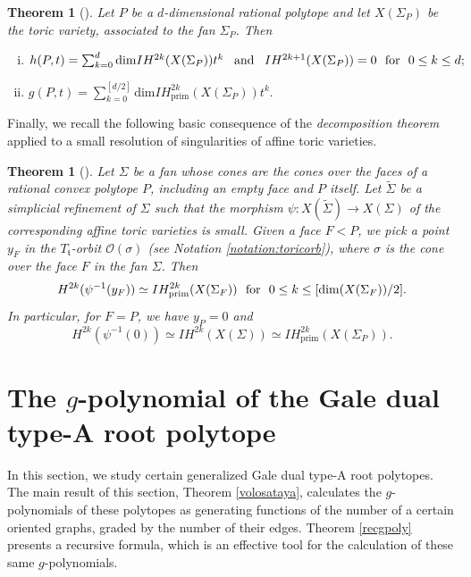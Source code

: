 \documentclass[11pt]{article}
\newtheorem{theorem}[theo]{Theorem}
\theoremstyle{definition}
\numberwithin{equation}{section}
\begin{document}
\begin{theorem}[\cite{Fiesler}]\label{IChandg}
Let $P$ be a $d$-dimensional rational polytope and let $X(\Sigma_P)$ be the toric variety, associated to the fan $\Sigma_P$. Then 
\begin{enumerate}[(i)]
\item $h(P, t) = \sum_{k=0}^{d} \mathrm{dim}IH^{2k}(X(\Sigma_P))t^k \text{\,\,\, and \,\,\,}  IH^{2k+1}(X(\Sigma_P))=0  \text{\,\, for\,\, } 0\leq k \leq d;$
\item $g(P,t) = \sum_{k=0}^{[d/2]} 
\mathrm{dim}IH_{\mathrm{prim}}^{2k}(X(\Sigma_P))t^k.$
\end{enumerate}
\end{theorem}

Finally, we recall the following basic consequence of the \textit{decomposition 
theorem} \cite{BBD} applied to a small resolution of singularities of affine toric 
varieties.
\begin{theorem}[\cite{Mauri}]\label{dec}
Let $\Sigma$ be a fan whose cones are the cones over the faces of a rational convex polytope $P$, including an empty face and $P$ itself. Let $\widetilde\Sigma$ be a simplicial refinement of $\Sigma$ such that the morphism $\psi: X(\widetilde\Sigma)\to X(\Sigma)$ of the corresponding  affine toric varieties is small. 
Given a face $F<P$, we pick a point $y_F$ in the 
 $T_\mathfrak{t}$-orbit 
 $\mathcal{O}(\sigma)$ (see Notation \ref{notation:toricorb}), where $ \sigma $ is the cone over the face $F$ in the fan 
 $\Sigma$. Then
$$H^{2k}(\psi^{-1}(y_F)) \simeq IH_{\mathrm{prim}}^{2k}(X(\Sigma_F)) \text{\,\, 
for\,\, }  0\leq k\leq [\mathrm{dim}(X(\Sigma_F))/2].$$
In particular, for $F=P$, we have $y_P=0$ and $$H^{2k}(\psi^{-1}(0)) \simeq 
IH^{2k}(X(\Sigma)) \simeq  IH_{\mathrm{prim}}^{2k}(X(\Sigma_P)).$$
\end{theorem}



\section{The \texorpdfstring{$g$}{g}-polynomial of the Gale dual type-A root polytope}\label{sec:zhepol}
In this section, we study certain generalized Gale dual type-A root polytopes. 
The 
main result of this section, Theorem \ref{volosataya}, calculates the 
$g$-polynomials of these polytopes as generating functions of the number of a 
certain oriented graphs, graded by the number of their edges. 
Theorem \ref{recgpoly} presents a recursive formula, which is an effective 
tool for the calculation of these same $g$-polynomials.  
\end{document}
